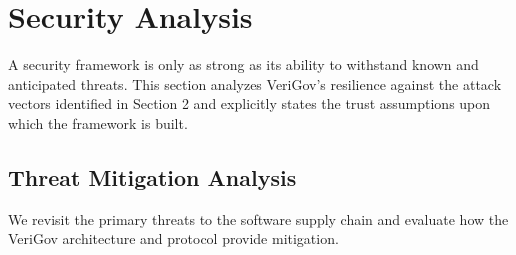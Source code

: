 \documentclass{article}
\begin{document}
\section{Security Analysis}
\label{sec:security-analysis}

A security framework is only as strong as its ability to withstand known and anticipated threats. This section analyzes VeriGov's resilience against the attack vectors identified in Section 2 and explicitly states the trust assumptions upon which the framework is built.

\subsection{Threat Mitigation Analysis}

We revisit the primary threats to the software supply chain and evaluate how the VeriGov architecture and protocol provide mitigation.
\end{document}

